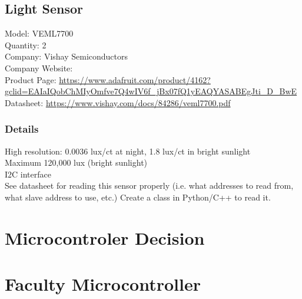 \subsection{Light Sensor}

Model: VEML7700 \\
Quantity: 2 \\
Company: Vishay Semiconductors \\
Company Website: \\
Product Page: \href{https://www.adafruit.com/product/4162?gclid=EAIaIQobChMIyOmfve7Q4wIV6f_jBx07fQ1yEAQYASABEgJti_D_BwE}{https://www.adafruit.com/product/4162?gclid=EAIaIQobChMIyOmfve7Q4wIV6f\_jBx07fQ1yEAQYASABEgJti\_D\_BwE} \\
Datasheet: \href{https://www.vishay.com/docs/84286/veml7700.pdf}{https://www.vishay.com/docs/84286/veml7700.pdf} \\ 

\subsubsection{Details}
High resolution: 0.0036 lux/ct at night, 1.8 lux/ct in bright sunlight \\
Maximum 120,000 lux (bright sunlight) \\
I2C interface \\

See datasheet for reading this sensor properly (i.e. what  addresses to read from, what slave address to use, etc.)
Create a class in Python/C++ to read it.

\section{Microcontroler Decision}


\section{Faculty Microcontroller}

